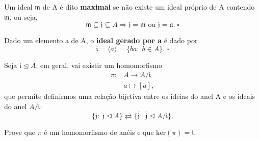 \documentclass[../algebraIII_notes.tex]{subfiles}
\begin{document}
\begin{def*}
	Um ideal \(\mathfrak{m}\) de A é dito \textbf{maximal} se não existe um ideal próprio de A contendo \(\mathfrak{m}\), ou seja,
	\[
		\mathfrak{m}\subsetneq  \mathfrak{j} \subsetneq A \Rightarrow \mathfrak{j} = \mathfrak{m} \text{ ou } \mathfrak{j}=\mathfrak{a}. \; \square
	\]
\end{def*}
\begin{def*}
	Dado um elemento a de A, o \textbf{ideal gerado por a} é dado por
	\[
		\mathfrak{i} = \langle a \rangle =\{ba:\; b\in A\}. \; \square
	\]
\end{def*}
Seja \(\mathfrak{i}\trianglelefteq A\); em geral, vai existir um homomorfismo
\begin{align*}
	\pi : & A\rightarrow A/\mathfrak{i} \\
	      & a\longmapsto [a],
\end{align*}
que permite definirmos uma relação bijetiva entre os ideias do anel A e os ideais do anel \(A/\mathfrak{i}\):
\[
	\{\mathfrak{j}:\; \mathfrak{j}\trianglelefteq A\} \rightleftarrows \{\overline{\mathfrak{j}}:\; \overline{\mathfrak{j}}\trianglelefteq A/\mathfrak{i}\}.
\]
\begin{exr}
	Prove que \(\pi \) é um homomorfismo de anéis e que \(\mathrm{ker}(\pi )=\mathfrak{i}.\)
\end{exr}
\end{document}
